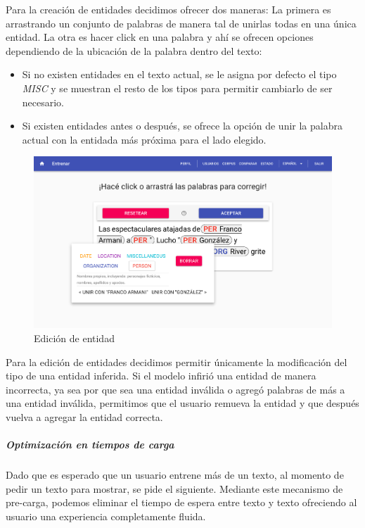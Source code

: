 \documentclass[12pt,a4paper,]{scrartcl}
\providecommand{\tightlist}{%
  \setlength{\itemsep}{0pt}\setlength{\parskip}{0pt}}
\let\oldsubparagraph\subparagraph
\renewcommand{\subparagraph}[1]{\oldsubparagraph{#1}\mbox{}}
\begin{document}
Para la creación de entidades decidimos ofrecer dos maneras: La primera es arrastrando un conjunto de palabras de manera tal de unirlas todas en una única entidad.
La otra es hacer click en una palabra y ahí se ofrecen opciones dependiendo de la ubicación de la palabra dentro del texto:

\begin{itemize}
\tightlist
\item
  Si no existen entidades en el texto actual, se le asigna por defecto el tipo \emph{MISC} y se muestran el resto de los tipos para permitir cambiarlo de ser necesario.
\item
  Si existen entidades antes o después, se ofrece la opción de unir la palabra actual con la entidada más próxima para el lado elegido.
\end{itemize}

\begin{figure}[H]

{\centering \includegraphics{assets/logic/train-popup.pdf} 

}

\caption{Edición de entidad}\label{fig:logic-train-popup}
\end{figure}

Para la edición de entidades decidimos permitir únicamente la modificación del tipo de una entidad inferida.
Si el modelo infirió una entidad de manera incorrecta, ya sea por que sea una entidad inválida o agregó palabras de más a una entidad inválida, permitimos que el usuario remueva la entidad y que después vuelva a agregar la entidad correcta.

\hypertarget{optimizaciuxf3n-en-tiempos-de-carga}{%
\subparagraph{Optimización en tiempos de carga}\label{optimizaciuxf3n-en-tiempos-de-carga}}

Dado que es esperado que un usuario entrene más de un texto, al momento de pedir un texto para mostrar, se pide el siguiente. Mediante este mecanismo de pre-carga, podemos eliminar el tiempo de espera entre texto y texto ofreciendo al usuario una experiencia completamente fluida.
\end{document}
